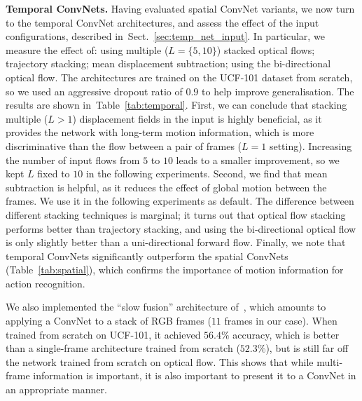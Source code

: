 \documentclass{article} \usepackage{nips14submit_e,times}
\newcommand{\tblref}[1]{Table~\ref{#1}}
\newcommand{\sref}[1]{Sect.~\ref{#1}}
\begin{document}
\noindent\textbf{Temporal ConvNets.}
Having evaluated spatial ConvNet variants, we now turn to the temporal ConvNet architectures, and assess the effect of the input configurations, described in~\sref{sec:temp_net_input}.
In particular, we measure the effect of: using multiple ($L=\{5,10\}$) stacked optical flows; trajectory stacking; mean displacement subtraction; using the bi-directional optical flow.
The architectures are trained on the UCF-101 dataset from scratch, so we used an aggressive dropout ratio of $0.9$ to help improve generalisation. 
The results are shown in~\tblref{tab:temporal}.
First, we can conclude that stacking multiple ($L>1$) displacement fields in the input is highly beneficial, as it provides the network with long-term motion information, which is more discriminative 
than the flow between a pair of frames ($L=1$ setting). Increasing the number of input flows from $5$ to $10$ leads to a smaller improvement, so we kept $L$ fixed to $10$ in the following experiments.
Second, we find that mean subtraction is helpful, as it reduces the effect of global motion between the frames. We use it in the following experiments as default.
The difference between different stacking techniques is marginal; it turns out that optical flow stacking performs better than trajectory stacking,
and using the bi-directional optical flow is only slightly better than a uni-directional forward flow.
Finally, we note that temporal ConvNets significantly outperform the spatial ConvNets (\tblref{tab:spatial}), which confirms the importance of motion information for action recognition.

We also implemented the ``slow fusion'' architecture of~\cite{Karpathy14}, which amounts to applying a \mbox{ConvNet} to a stack of RGB frames ($11$ frames in our case).
When trained from scratch on UCF-101, it achieved $56.4\%$ accuracy, which is better than a single-frame architecture trained from scratch ($52.3\%$), but is still far off the network 
trained from scratch on optical flow. This shows that while multi-frame information is important, it is also important to present it to a ConvNet in an appropriate manner.
\end{document}
